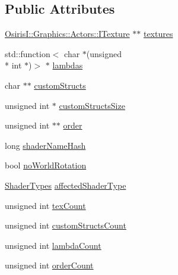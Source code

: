\subsection*{Public Attributes}
\begin{DoxyCompactItemize}
\item 
\hyperlink{class_osiris_i_1_1_graphics_1_1_actors_1_1_i_texture}{Osiris\-I\-::\-Graphics\-::\-Actors\-::\-I\-Texture} $\ast$$\ast$ \hyperlink{struct_osiris_i_1_1_graphics_1_1_shader_1_1_shader_info_a5a12769ed7c4f700599977bb3418122e}{textures}
\item 
std\-::function$<$ char $\ast$(unsigned \\*
int $\ast$)$>$ $\ast$ \hyperlink{struct_osiris_i_1_1_graphics_1_1_shader_1_1_shader_info_abbc3aebbbc247c0cb7032baff99432db}{lambdas}
\item 
char $\ast$$\ast$ \hyperlink{struct_osiris_i_1_1_graphics_1_1_shader_1_1_shader_info_a7664ece28b4ae4026778fcbd0f85445f}{custom\-Structs}
\item 
unsigned int $\ast$ \hyperlink{struct_osiris_i_1_1_graphics_1_1_shader_1_1_shader_info_a9b4cce0049bcdb4a7eb364a7c0ce14a5}{custom\-Structs\-Size}
\item 
unsigned int $\ast$$\ast$ \hyperlink{struct_osiris_i_1_1_graphics_1_1_shader_1_1_shader_info_a4c38fbc420ffe7d94fcdd1207ded54ca}{order}
\item 
long \hyperlink{struct_osiris_i_1_1_graphics_1_1_shader_1_1_shader_info_a2a80744a881d32d7bab8ff9e5dcd5996}{shader\-Name\-Hash}
\item 
bool \hyperlink{struct_osiris_i_1_1_graphics_1_1_shader_1_1_shader_info_a18b30e1360b4ac3ea48e2c6e409137fa}{no\-World\-Rotation}
\item 
\hyperlink{namespace_osiris_i_1_1_graphics_1_1_shader_a337cc6333eff5c701288da2fb4fd9cec}{Shader\-Types} \hyperlink{struct_osiris_i_1_1_graphics_1_1_shader_1_1_shader_info_a127a6d61e72b4e00ba94edbd34b2833c}{affected\-Shader\-Type}
\item 
unsigned int \hyperlink{struct_osiris_i_1_1_graphics_1_1_shader_1_1_shader_info_ad119556aed2dd1c102f40ad53a1cf69d}{tex\-Count}
\item 
unsigned int \hyperlink{struct_osiris_i_1_1_graphics_1_1_shader_1_1_shader_info_a91ef5c84d7d51acd07368427b17e4b55}{custom\-Structs\-Count}
\item 
unsigned int \hyperlink{struct_osiris_i_1_1_graphics_1_1_shader_1_1_shader_info_a82fad82c956c986488bec68014832f6a}{lambda\-Count}
\item 
unsigned int \hyperlink{struct_osiris_i_1_1_graphics_1_1_shader_1_1_shader_info_a09bc29766eb0f66568d2c550119eb1db}{order\-Count}
\end{DoxyCompactItemize}


